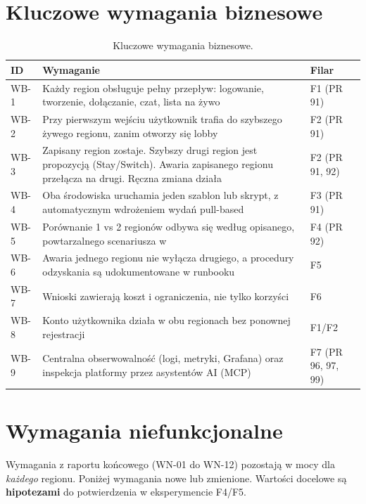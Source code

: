 \section{Kluczowe wymagania biznesowe}
\begin{table}[H]
\centering\small
\begin{tabularx}{\textwidth}{@{}lYl@{}}
\toprule
\textbf{ID} & \textbf{Wymaganie} & \textbf{Filar} \\
\midrule
WB-1 & Każdy region obsługuje pełny przepływ: logowanie, tworzenie, dołączanie, czat, lista na żywo & F1 (PR 91) \\
WB-2 & Przy pierwszym wejściu użytkownik trafia do szybszego żywego regionu, zanim otworzy się lobby & F2 (PR 91) \\
WB-3 & Zapisany region zostaje. Szybszy drugi region jest propozycją (Stay/Switch). Awaria zapisanego regionu przełącza na drugi. Ręczna zmiana działa & F2 (PR 91, 92) \\
WB-4 & Oba środowiska uruchamia jeden szablon lub skrypt, z automatycznym wdrożeniem wydań pull-based & F3 (PR 91) \\
WB-5 & Porównanie 1 vs 2 regionów odbywa się według opisanego, powtarzalnego scenariusza w  & F4 (PR 92) \\
WB-6 & Awaria jednego regionu nie wyłącza drugiego, a procedury odzyskania są udokumentowane w runbooku & F5 \\
WB-7 & Wnioski zawierają koszt i ograniczenia, nie tylko korzyści & F6 \\
WB-8 & Konto użytkownika działa w obu regionach bez ponownej rejestracji & F1/F2 \\
WB-9 & Centralna obserwowalność (logi, metryki, Grafana) oraz inspekcja platformy przez asystentów AI (MCP) & F7 (PR 96, 97, 99) \\
\bottomrule
\end{tabularx}
\caption{Kluczowe wymagania biznesowe.}
\end{table}

\section{Wymagania niefunkcjonalne}
Wymagania z raportu końcowego (WN-01 do WN-12) pozostają w mocy dla \emph{każdego}
regionu. Poniżej wymagania nowe lub zmienione. Wartości docelowe są
\textbf{hipotezami} do potwierdzenia w eksperymencie F4/F5.

